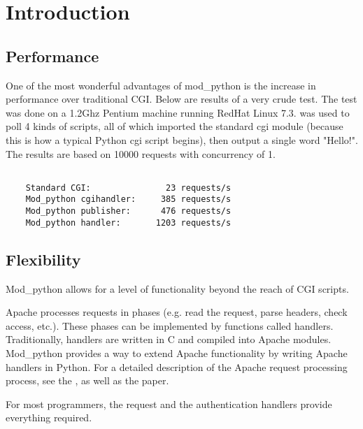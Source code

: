 \chapter{Introduction\label{introduction}}

\section{Performance\label{intr-performance}}

One of the most wonderful advantages of mod_python is the increase in
performance over traditional CGI. Below are results of a very crude
test. The test was done on a 1.2Ghz Pentium machine running RedHat
Linux
7.3. 
was used to poll 4 kinds of scripts, all of which imported the
standard cgi module (because this is how a typical Python cgi script
begins), then output a single word "Hello!". The results are based on
10000 requests with concurrency of 1.

\begin{verbatim}

    Standard CGI:               23 requests/s
    Mod_python cgihandler:     385 requests/s
    Mod_python publisher:      476 requests/s
    Mod_python handler:       1203 requests/s

\end{verbatim}         

\section{Flexibility\label{intr-flexibility}}

Mod_python allows for a level of functionality beyond the reach of
CGI scripts.

Apache processes requests in phases (e.g. read the request, parse
headers, check access, etc.). These phases can be implemented by
functions called handlers. Traditionally, handlers are written in C
and compiled into Apache modules. Mod_python provides a way to extend
Apache functionality by writing Apache handlers in Python. For a
detailed description of the Apache request processing process, see the
, as well
as the  paper.

For most programmers, the request and the authentication handlers
provide everything required.


